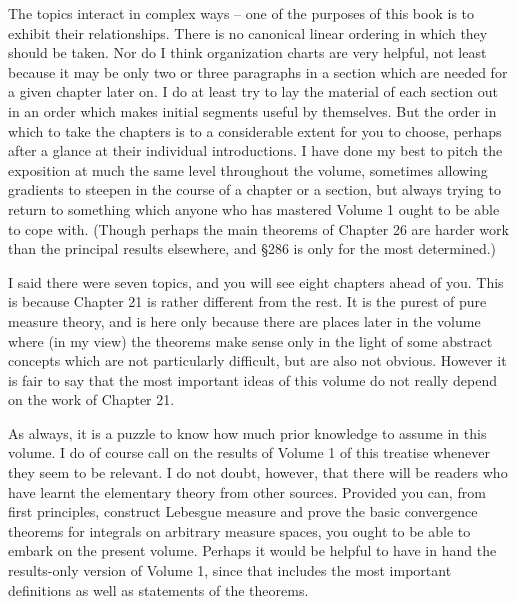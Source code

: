 The topics interact in complex ways -- one of the purposes of this book 
is to exhibit their relationships.   There is no canonical linear 
ordering in which they should be taken.   Nor do I think organization 
charts are very helpful, not least because it may be only two or three 
paragraphs in a section which are needed for a given chapter later on. 
I do at least try to lay the material of each section out in an order 
which makes initial segments useful by themselves.   But the order in 
which to take the chapters is to a considerable extent for you to 
choose, perhaps after a glance at their individual introductions.   I 
have done my best to pitch the exposition at much the same level 
throughout the volume, sometimes allowing gradients to steepen in the 
course of a chapter or a section, but always trying to return to 
something which anyone who has mastered Volume 1 ought to be able to 
cope with.   (Though perhaps the main theorems of Chapter 26 are harder 
work than the principal results elsewhere, and \S286 is only for the most  
determined.) 
 
I said there were seven topics, and you will see eight chapters ahead of 
you.   This is because Chapter 21 is rather different from the rest. 
It is the purest of pure measure theory, and is here only because there 
are places later in the volume where (in my view) the theorems make 
sense only in the light of some abstract concepts which are not 
particularly difficult, but are also not obvious.   However it is fair 
to say that the most important ideas of this volume do not really depend 
on the work of Chapter 21. 
 
As always, it is a puzzle to know how much prior knowledge to assume in 
this volume.   I do of course call on the results of Volume 1 of this 
treatise whenever they seem to be relevant.   I do not doubt, however, 
that there will be readers who have learnt the elementary theory from 
other sources.   Provided you can, from first principles, construct 
Lebesgue measure and prove the basic convergence theorems for integrals 
on arbitrary measure spaces, you ought to be able to embark on the 
present volume.   Perhaps it would be helpful to have in hand the 
results-only version of Volume 1, since that includes the most important 
definitions as well as statements of the theorems. 
 
